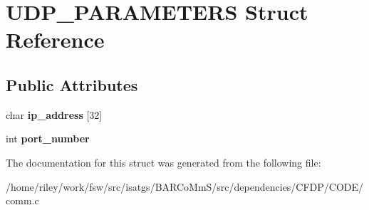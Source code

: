 \hypertarget{struct_u_d_p___p_a_r_a_m_e_t_e_r_s}{}\section{U\+D\+P\+\_\+\+P\+A\+R\+A\+M\+E\+T\+E\+RS Struct Reference}
\label{struct_u_d_p___p_a_r_a_m_e_t_e_r_s}
\subsection*{Public Attributes}
\begin{DoxyCompactItemize}
\item 
char {\bfseries ip\+\_\+address} \mbox{[}32\mbox{]}\hypertarget{struct_u_d_p___p_a_r_a_m_e_t_e_r_s_ade33bb65242e853570d76f8208079074}{}\label{struct_u_d_p___p_a_r_a_m_e_t_e_r_s_ade33bb65242e853570d76f8208079074}

\item 
int {\bfseries port\+\_\+number}\hypertarget{struct_u_d_p___p_a_r_a_m_e_t_e_r_s_a58ccf0b4d20d9384a910ccc63f1ac493}{}\label{struct_u_d_p___p_a_r_a_m_e_t_e_r_s_a58ccf0b4d20d9384a910ccc63f1ac493}

\end{DoxyCompactItemize}


The documentation for this struct was generated from the following file\+:\begin{DoxyCompactItemize}
\item 
/home/riley/work/fsw/src/isatgs/\+B\+A\+R\+Co\+Mm\+S/src/dependencies/\+C\+F\+D\+P/\+C\+O\+D\+E/comm.\+c\end{DoxyCompactItemize}

